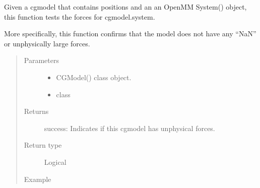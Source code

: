 \documentclass[letterpaper,12pt,english,openany,oneside]{sphinxmanual}
\begin{document}
\begin{fulllineitems}
\end{fulllineitems}


\begin{fulllineitems}
\label{\detokenize{build:build.cg_build.test_forces}}
Given a cgmodel that contains positions and an
an OpenMM System() object, this function tests 
the forces for cgmodel.system.

More specifically, this function confirms that the
model does not have any “NaN” or unphysically large forces.
\begin{quote}\begin{description}
\item[{Parameters}] \leavevmode\begin{itemize}
\item {} 
 \textendash{} CGModel() class object.

\item {} 
 \textendash{} class

\end{itemize}

\item[{Returns}] \leavevmode
success: Indicates if this cgmodel has unphysical forces.

\item[{Return type}] \leavevmode
Logical

\item[{Example}] \leavevmode
\end{description}\end{quote}

\begin{sphinxVerbatim}[commandchars=\\\{\}]
   
  
  
\end{sphinxVerbatim}

\end{fulllineitems}
\end{document}
